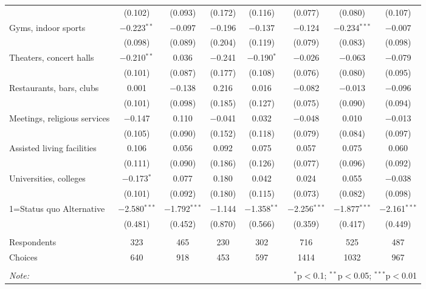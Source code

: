 \begin{table}[!htbp]
\begin{tabular}{@{\extracolsep{5pt}}lccccccc}
  & (0.102) & (0.093) & (0.172) & (0.116) & (0.077) & (0.080) & (0.107) \\ 
  Gyms, indoor sports & $-$0.223$^{**}$ & $-$0.097 & $-$0.196 & $-$0.137 & $-$0.124 & $-$0.234$^{***}$ & $-$0.007 \\ 
  & (0.098) & (0.089) & (0.204) & (0.119) & (0.079) & (0.083) & (0.098) \\ 
  Theaters, concert halls & $-$0.210$^{**}$ & 0.036 & $-$0.241 & $-$0.190$^{*}$ & $-$0.026 & $-$0.063 & $-$0.079 \\ 
  & (0.101) & (0.087) & (0.177) & (0.108) & (0.076) & (0.080) & (0.095) \\ 
  Restaurants, bars, clubs & 0.001 & $-$0.138 & 0.216 & 0.016 & $-$0.082 & $-$0.013 & $-$0.096 \\ 
  & (0.101) & (0.098) & (0.185) & (0.127) & (0.075) & (0.090) & (0.094) \\ 
  Meetings, religious services & $-$0.147 & 0.110 & $-$0.041 & 0.032 & $-$0.048 & 0.010 & $-$0.013 \\ 
  & (0.105) & (0.090) & (0.152) & (0.118) & (0.079) & (0.084) & (0.097) \\ 
  Assisted living facilities & 0.106 & 0.056 & 0.092 & 0.075 & 0.057 & 0.075 & 0.060 \\ 
  & (0.111) & (0.090) & (0.186) & (0.126) & (0.077) & (0.096) & (0.092) \\ 
  Universities, colleges & $-$0.173$^{*}$ & 0.077 & 0.180 & 0.042 & 0.024 & 0.055 & $-$0.038 \\ 
  & (0.101) & (0.092) & (0.180) & (0.115) & (0.073) & (0.082) & (0.098) \\ 
  1=Status quo Alternative & $-$2.580$^{***}$ & $-$1.792$^{***}$ & $-$1.144 & $-$1.358$^{**}$ & $-$2.256$^{***}$ & $-$1.877$^{***}$ & $-$2.161$^{***}$ \\ 
  & (0.481) & (0.452) & (0.870) & (0.566) & (0.359) & (0.417) & (0.449) \\ 
 \hline \\[-1.8ex] 
Respondents & 323 & 465 & 230 & 302 & 716 & 525 & 487\\ 
 Choices & 640 & 918 & 453 & 597 & 1414 & 1032 & 967\\ 
\hline 
\hline \\[-1.8ex] 
\textit{Note:}  & \multicolumn{7}{r}{$^{*}$p$<$0.1; $^{**}$p$<$0.05; $^{***}$p$<$0.01} \\ 
\end{tabular} 
\end{table} 
